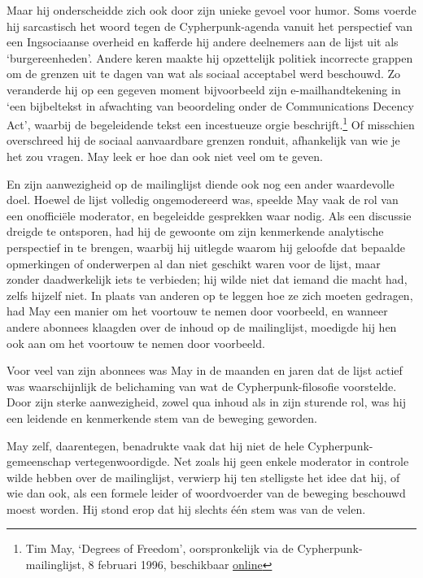 \documentclass[
  a5paper,
  smalldemyvopaper,11pt,twoside,onecolumn,openright,extrafontsizes]{memoir}
\begin{document}
Maar hij onderscheidde zich ook door zijn unieke gevoel voor humor. Soms
voerde hij sarcastisch het woord tegen de Cypherpunk-agenda vanuit het
perspectief van een Ingsociaanse overheid en kafferde hij andere
deelnemers aan de lijst uit als `burgereenheden'. Andere keren maakte
hij opzettelijk politiek incorrecte grappen om de grenzen uit te dagen
van wat als sociaal acceptabel werd beschouwd. Zo veranderde hij op een
gegeven moment bijvoorbeeld zijn e-mailhandtekening in `een bijbeltekst
in afwachting van beoordeling onder de Communications Decency Act',
waarbij de begeleidende tekst een incestueuze orgie
beschrijft.\footnote{Tim May, `Degrees of Freedom', oorspronkelijk via
  de Cypherpunk-mailinglijst, 8 februari 1996, beschikbaar
  \href{https://cypherpunks.venona.com/date/1996/02/msg00637.html}{online}}
Of misschien overschreed hij de sociaal aanvaardbare grenzen ronduit,
afhankelijk van wie je het zou vragen. May leek er hoe dan ook niet veel
om te geven.

En zijn aanwezigheid op de mailinglijst diende ook nog een ander
waardevolle doel. Hoewel de lijst volledig ongemodereerd was, speelde
May vaak de rol van een onofficiële moderator, en begeleidde gesprekken
waar nodig. Als een discussie dreigde te ontsporen, had hij de gewoonte
om zijn kenmerkende analytische perspectief in te brengen, waarbij hij
uitlegde waarom hij geloofde dat bepaalde opmerkingen of onderwerpen al
dan niet geschikt waren voor de lijst, maar zonder daadwerkelijk iets te
verbieden; hij wilde niet dat iemand die macht had, zelfs hijzelf niet.
In plaats van anderen op te leggen hoe ze zich moeten gedragen, had May
een manier om het voortouw te nemen door voorbeeld, en wanneer andere
abonnees klaagden over de inhoud op de mailinglijst, moedigde hij hen
ook aan om het voortouw te nemen door voorbeeld.

Voor veel van zijn abonnees was May in de maanden en jaren dat de lijst
actief was waarschijnlijk de belichaming van wat de Cypherpunk-filosofie
voorstelde. Door zijn sterke aanwezigheid, zowel qua inhoud als in zijn
sturende rol, was hij een leidende en kenmerkende stem van de beweging
geworden.

May zelf, daarentegen, benadrukte vaak dat hij niet de hele
Cypherpunk-gemeenschap vertegenwoordigde. Net zoals hij geen enkele
moderator in controle wilde hebben over de mailinglijst, verwierp hij
ten stelligste het idee dat hij, of wie dan ook, als een formele leider
of woordvoerder van de beweging beschouwd moest worden. Hij stond erop
dat hij slechts één stem was van de velen.
\end{document}
